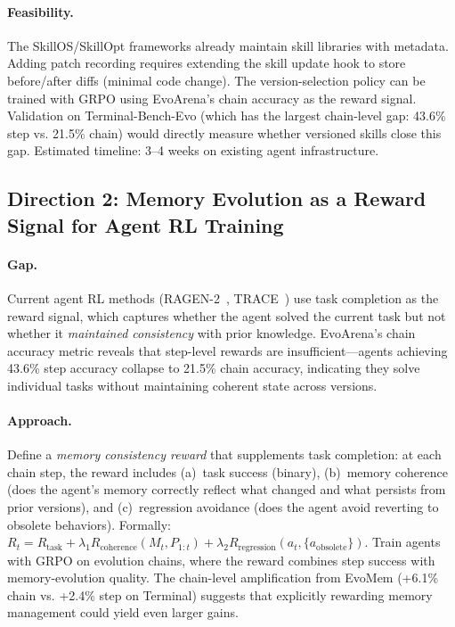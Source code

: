 \documentclass[11pt,a4paper]{article}
\begin{document}
\paragraph{Feasibility.} The SkillOS/SkillOpt frameworks already maintain skill libraries with metadata. Adding patch recording requires extending the skill update hook to store before/after diffs (minimal code change). The version-selection policy can be trained with GRPO using EvoArena's chain accuracy as the reward signal. Validation on Terminal-Bench-Evo (which has the largest chain-level gap: 43.6\% step vs. 21.5\% chain) would directly measure whether versioned skills close this gap. Estimated timeline: 3--4 weeks on existing agent infrastructure.

\subsection{Direction 2: Memory Evolution as a Reward Signal for Agent RL Training}

\paragraph{Gap.} Current agent RL methods (RAGEN-2~\cite{xu2026ragen2}, TRACE~\cite{chen2026trace}) use task completion as the reward signal, which captures whether the agent solved the current task but not whether it \emph{maintained consistency} with prior knowledge. EvoArena's chain accuracy metric reveals that step-level rewards are insufficient---agents achieving 43.6\% step accuracy collapse to 21.5\% chain accuracy, indicating they solve individual tasks without maintaining coherent state across versions.

\paragraph{Approach.} Define a \emph{memory consistency reward} that supplements task completion: at each chain step, the reward includes (a)~task success (binary), (b)~memory coherence (does the agent's memory correctly reflect what changed and what persists from prior versions), and (c)~regression avoidance (does the agent avoid reverting to obsolete behaviors). Formally: $R_t = R_{\mathrm{task}} + \lambda_1 R_{\mathrm{coherence}}(M_t, P_{1:t}) + \lambda_2 R_{\mathrm{regression}}(a_t, \{a_{\mathrm{obsolete}}\})$. Train agents with GRPO on evolution chains, where the reward combines step success with memory-evolution quality. The chain-level amplification from EvoMem (+6.1\% chain vs. +2.4\% step on Terminal) suggests that explicitly rewarding memory management could yield even larger gains.
\end{document}

